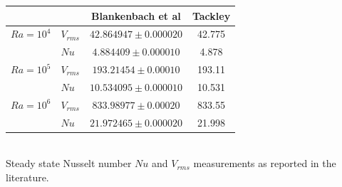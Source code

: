 \begin{center}
\begin{tabular}{llcc}
\hline
          &           & Blankenbach et al & Tackley \cite{tack94}    \\
\hline
\hline
$Ra=10^4$ & $V_{rms}$ &  $42.864947  \pm 0.000020$ & 42.775 \\
          & $Nu$      &  $4.884409   \pm 0.000010$ & 4.878  \\
$Ra=10^5$ & $V_{rms}$ &  $193.21454  \pm 0.00010 $ & 193.11 \\
          & $Nu$      &  $10.534095  \pm 0.000010$ & 10.531 \\
$Ra=10^6$ & $V_{rms}$ &  $833.98977  \pm 0.00020 $ & 833.55 \\
          & $Nu$      &  $21.972465  \pm 0.000020$ & 21.998 \\
\hline
\end{tabular}\\
{\small Steady state Nusselt number $Nu$ and $V_{rms}$ measurements as reported in the literature. }
\end{center}







